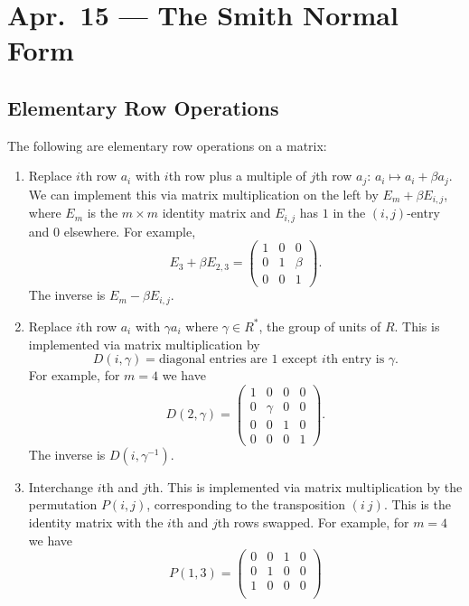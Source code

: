 \chapter{Apr.~15 --- The Smith Normal Form}

\section{Elementary Row Operations}
The following are elementary row operations on a matrix:
\begin{enumerate}
  \item Replace $i$th row $a_i$ with $i$th row plus a
    multiple of $j$th row $a_j$: $a_i \mapsto a_i + \beta a_j$.
    We can implement this via matrix multiplication on the
    left by $E_m + \beta E_{i, j}$, where $E_m$ is the
    $m \times m$ identity matrix and $E_{i, j}$ has
    $1$ in the $(i, j)$-entry and $0$ elsewhere.
    For example,
    \[
      E_3 + \beta E_{2, 3}
      = \begin{pmatrix}
        1 & 0 & 0 \\
        0 & 1 & \beta \\
        0 & 0 & 1
      \end{pmatrix}.
    \]
    The inverse is $E_m - \beta E_{i, j}$.
  \item Replace $i$th row $a_i$ with
    $\gamma a_i$ where $\gamma \in R^*$, the group of
    units of $R$. This is implemented via matrix
    multiplication by
    \[
      D(i, \gamma) = \text{diagonal entries are $1$ except $i$th entry is $\gamma$}.
    \]
    For example, for $m = 4$ we have
    \[
      D(2, \gamma) =
      \begin{pmatrix}
        1 & 0 & 0 & 0 \\
        0 & \gamma & 0 & 0 \\
        0 & 0 & 1 & 0 \\
        0 & 0 & 0 & 1
      \end{pmatrix}.
    \]
    The inverse is $D(i, \gamma^{-1})$.
  \item Interchange $i$th and $j$th. This is implemented
    via matrix multiplication by the permutation
    $P(i, j)$, corresponding to the transposition
    $(i\ j)$. This is the identity matrix with the
    $i$th and $j$th rows swapped. For example, for
    $m = 4$ we have
    \[
      P(1, 3) =
      \begin{pmatrix}
        0 & 0 & 1 & 0 \\
        0 & 1 & 0 & 0 \\
        1 & 0 & 0 & 0 \\

\end{pmatrix}\]
\end{enumerate}
